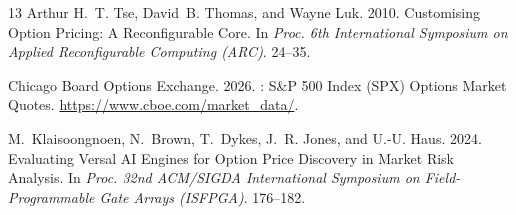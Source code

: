 \documentclass[sigconf,anonymous,review]{acmart}
\begin{document}
\begin{thebibliography}{13}
Arthur H.~T. Tse, David~B. Thomas, and Wayne Luk. 2010.
\newblock Customising Option Pricing: A Reconfigurable Core.
\newblock In \emph{Proc. 6th International Symposium on Applied Reconfigurable Computing (ARC)}. 24--35.

{Chicago Board Options Exchange}. 2026.
: {S\&P 500} Index ({SPX}) Options Market Quotes.
\newblock \url{https://www.cboe.com/market_data/}.

M.~Klaisoongnoen, N.~Brown, T.~Dykes, J.~R. Jones, and U.-U. Haus. 2024.
\newblock Evaluating {Versal AI} Engines for Option Price Discovery in Market Risk Analysis.
\newblock In \emph{Proc. 32nd ACM/SIGDA International Symposium on Field-Programmable Gate Arrays (ISFPGA)}. 176--182.

\end{thebibliography}
\end{document}
